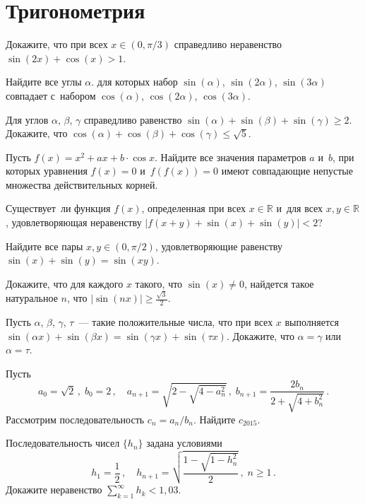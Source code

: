 
\section*{Тригонометрия}


\begin{problems}

\item
Докажите, что при всех $x \in (0, \pi / 3)$ справедливо неравенство
\(
    \sin(2 x) + \cos(x) > 1
\).

\item
Найдите все углы $\alpha$. для которых набор
$\sin(\alpha)$, $\sin(2 \alpha)$, $\sin(3 \alpha)$ совпадает с~набором
$\cos(\alpha)$, $\cos(2 \alpha)$, $\cos(3 \alpha)$.

\item
Для углов $\alpha$, $\beta$, $\gamma$ справедливо равенство
\(
    \sin(\alpha) + \sin(\beta) + \sin(\gamma)
\geq
    2
\).
Докажите, что
\(
    \cos(\alpha) + \cos(\beta) + \cos(\gamma)
\leq
    \sqrt{5}
\).

\item
Пусть $f(x) = x^2 + a x + b \cdot \cos{x}$.
Найдите все значения параметров $a$ и~$b$, при которых уравнения
$f(x) = 0$ и~$f(f(x)) = 0$ имеют совпадающие непустые множества действительных
корней.

\item
Существует~ли функция $f(x)$, определенная при всех $x \in \mathbb{R}$
и~для всех $x, y \in \mathbb{R}$, удовлетворяющая неравенству
\(
    |f(x + y) + \sin(x) + \sin(y)|
<
    2
\)?

\item
Найдите все пары $x, y \in (0, \pi / 2)$, удовлетворяющие равенству
\(
    \sin(x) + \sin(y) = \sin(x y)
\).

\item
Докажите, что для каждого $x$ такого, что $\sin(x) \neq 0$, найдется
такое натуральное $n$, что
\(
    |\sin(nx)|
\geq
    \frac{\sqrt{3}}{2}
\).

\item
Пусть $\alpha$, $\beta$, $\gamma$, $\tau$~--- такие положительные
числа, что при всех $x$ выполняется
\(
    \sin(\alpha x) + \sin(\beta x)
=
    \sin(\gamma x) + \sin(\tau x)
\).
Докажите, что $\alpha = \gamma$ или $\alpha = \tau$.

\item
Пусть
\[
    a_0 = \sqrt{2}
\,,\;
    b_0 = 2
\,,\quad
    a_{n+1} = \sqrt{2 - \sqrt{4 - a^2_n}}
\,,\;
    b_{n+1} = \frac{2 b_n}{2 + \sqrt{4 + b^2_n}}
\,.\]
Рассмотрим последовательность $c_n = a_n / b_n$.
Найдите $c_{2015}$.

\item
Последовательность чисел $\{ h_n \}$ задана условиями
\[
    h_1 = \frac{1}{2}
\,,\quad
    h_{n+1} = \sqrt{\frac{1 - \sqrt{1 - h_n^2}}{2}}
\,,\;
    n \geq 1
\,.\]
Докажите неравенство
\(
    \sum_{k=1}^\infty
        h_k
<
    1{,}03
\).

\end{problems}

